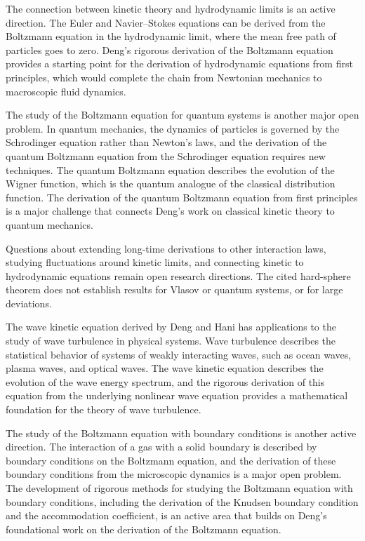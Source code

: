 The connection between kinetic theory and hydrodynamic limits is an active direction. The Euler and Navier--Stokes equations can be derived from the Boltzmann equation in the hydrodynamic limit, where the mean free path of particles goes to zero. Deng's rigorous derivation of the Boltzmann equation provides a starting point for the derivation of hydrodynamic equations from first principles, which would complete the chain from Newtonian mechanics to macroscopic fluid dynamics.

The study of the Boltzmann equation for quantum systems is another major open problem. In quantum mechanics, the dynamics of particles is governed by the Schrodinger equation rather than Newton's laws, and the derivation of the quantum Boltzmann equation from the Schrodinger equation requires new techniques. The quantum Boltzmann equation describes the evolution of the Wigner function, which is the quantum analogue of the classical distribution function. The derivation of the quantum Boltzmann equation from first principles is a major challenge that connects Deng's work on classical kinetic theory to quantum mechanics.

Questions about extending long-time derivations to other interaction laws, studying fluctuations around kinetic limits, and connecting kinetic to hydrodynamic equations remain open research directions. The cited hard-sphere theorem does not establish results for Vlasov or quantum systems, or for large deviations.

The wave kinetic equation derived by Deng and Hani has applications to the study of wave turbulence in physical systems. Wave turbulence describes the statistical behavior of systems of weakly interacting waves, such as ocean waves, plasma waves, and optical waves. The wave kinetic equation describes the evolution of the wave energy spectrum, and the rigorous derivation of this equation from the underlying nonlinear wave equation provides a mathematical foundation for the theory of wave turbulence.

The study of the Boltzmann equation with boundary conditions is another active direction. The interaction of a gas with a solid boundary is described by boundary conditions on the Boltzmann equation, and the derivation of these boundary conditions from the microscopic dynamics is a major open problem. The development of rigorous methods for studying the Boltzmann equation with boundary conditions, including the derivation of the Knudsen boundary condition and the accommodation coefficient, is an active area that builds on Deng's foundational work on the derivation of the Boltzmann equation.

